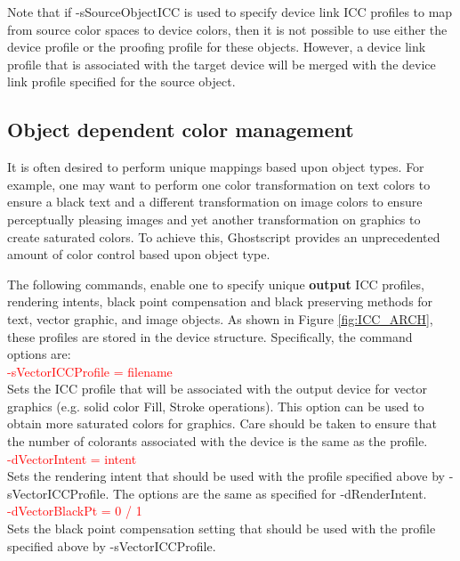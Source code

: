 \documentclass[12pt,notitlepage]{article}
\begin{document}
Note that if -sSourceObjectICC is used to specify device link ICC profiles to map from source color spaces to device colors, then it is not possible to use either the device profile or the proofing profile for these objects.  However, a device link profile that is associated with the target device will be merged with the device link profile specified for the source object.

\subsection{Object dependent color management}

It is often desired to perform unique mappings based upon object types.  For example, one may want to perform one color transformation on text colors to ensure a black text and a different transformation on image colors to ensure perceptually pleasing images and yet another transformation on graphics to create saturated colors.   To achieve this, Ghostscript provides an unprecedented amount of color control based upon object type.

The following commands, enable one to specify unique {\bf output} ICC profiles, rendering intents, black point compensation and black preserving methods for text, vector graphic, and image objects.  As shown in Figure \ref{fig:ICC_ARCH}, these profiles are stored in the device structure.  Specifically, the command options are:\\

\textcolor{red}{-sVectorICCProfile = filename}\\

\noindent Sets the ICC profile that will be associated with the output device for vector graphics (e.g. solid color Fill, Stroke operations). This option can be used to obtain more saturated colors for graphics.  Care should be taken to ensure that the number of colorants associated with the device is the same as the profile. \\

\textcolor{red}{-dVectorIntent = intent}\\

\noindent Sets the rendering intent that should be used with the profile specified above by -sVectorICCProfile. The options are the same as specified for -dRenderIntent.\\

\textcolor{red}{-dVectorBlackPt = 0 / 1}\\

\noindent Sets the black point compensation setting that should be used with the profile specified above by -sVectorICCProfile.\\
\end{document}
